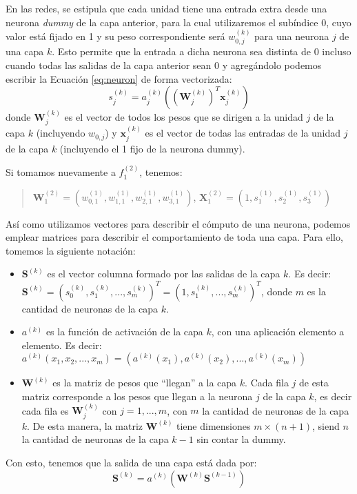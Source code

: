 \documentclass[../../main.tex]{subfiles}
\begin{document}
En las redes, se estipula que cada unidad tiene una entrada extra desde una neurona
\textit{dummy} de la capa anterior, para la cual utilizaremos el subíndice 0, cuyo valor
está fijado en 1 y su peso correspondiente será \(w^{(k)}_{0,j}\) para una neurona \(j\)
de una capa \(k\). Esto permite que la entrada a dicha neurona sea distinta de 0
incluso cuando todas las salidas de la capa anterior sean 0 \cite{ai-a-modern-approach} y
agregándolo podemos escribir la Ecuación \ref{eq:neuron} de forma vectorizada:
\begin{equation}
    s^{(k)}_j = a^{(k)}_j \left( \left( \mathbf{W}^{(k)}_j \right)^T \mathbf{x}^{(k)}_j \right)
\end{equation}
donde \(\mathbf{W}^{(k)}_j\) es el vector de todos los pesos que se dirigen a la unidad \(j\) de
la capa \(k\) (incluyendo \(w_{0,j}\)) y \(\mathbf{x}^{(k)}_j\) es el vector de todas las entradas
de la unidad \(j\) de la capa \(k\) (incluyendo el 1 fijo de la neurona dummy).

Si tomamos nuevamente a \(f^{(2)}_1\), tenemos:
\begin{quote}
    \(\mathbf{W}^{(2)}_1 = (w^{(1)}_{0,1}, w^{(1)}_{1,1}, w^{(1)}_{2,1}, w^{(1)}_{3,1})\),
    \(\mathbf{X}^{(2)}_1 = (1, s^{(1)}_1, s^{(1)}_2, s^{(1)}_3)\)
\end{quote}

Así como utilizamos vectores para describir el cómputo de una neurona, podemos emplear
matrices para describir el comportamiento de toda una capa. Para ello, tomemos la siguiente
notación:
\begin{itemize}[itemsep=0.1cm]
    \item \(\mathbf{S}^{(k)}\) es el vector columna formado por las salidas de la capa
    \(k\). Es decir: \(\mathbf{S}^{(k)} = (s_0^{(k)}, s_1^{(k)}, ..., s_m^{(k)})^T = (1,
    s_1^{(k)}, ..., s_m^{(k)})^T\), donde \(m\) es la cantidad de neuronas de la capa
    \(k\).
    \item \(a^{(k)}\) es la función de activación de la capa \(k\), con una aplicación
    elemento a elemento. Es decir: \(a^{(k)}(x_1, x_2, ..., x_m) = (a^{(k)}(x_1),
    a^{(k)}(x_2), ..., a^{(k)}(x_m))\)
    \item \(\mathbf{W}^{(k)}\) es la matriz de pesos que ``llegan'' a la capa \(k\). Cada
    fila \(j\) de esta matriz corresponde a los pesos que llegan a la neurona \(j\) de la
    capa \(k\), es decir cada fila es \(\mathbf{W}^{(k)}_j\) con \(j = 1,...,m\), con
    \(m\) la cantidad de neuronas de la capa \(k\). De esta manera, la matriz \(\mathbf{W}^{(k)}\)
    tiene dimensiones \(m \times (n + 1)\), siend \(n\) la cantidad de neuronas de la capa
    \(k-1\) sin contar la dummy.
\end{itemize}
Con esto, tenemos que la salida de una capa está dada por:
\[
    \mathbf{S}^{(k)} = a^{(k)} \left( \mathbf{W}^{(k)} \mathbf{S}^{(k-1)} \right)
\]
\end{document}
